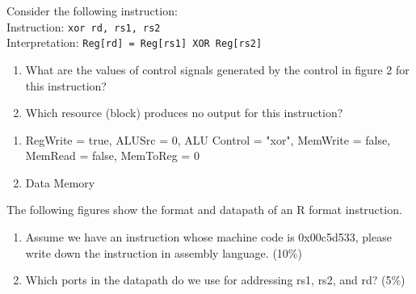 \documentclass[12pt, a4paper]{article}
\begin{document}
\pagebreak
\begin{q}{10}
Consider the following instruction:\\
Instruction: \texttt{xor rd, rs1, rs2}\\
Interpretation: \texttt{Reg[rd] = Reg[rs1] XOR Reg[rs2]}
\begin{enumerate}
    \item What are the values of control signals generated by the control in figure 2 for this
    instruction?
    \item Which resource (block) produces no output for this instruction?
\end{enumerate}
\begin{center}
\end{center}
\end{q}
\begin{ans}
    \begin{enumerate}
        \item RegWrite = true, ALUSrc = 0, ALU Control = "xor", MemWrite = false, \\MemRead = false, MemToReg = 0 
        \item Data Memory
    \end{enumerate}
\end{ans}
\pagebreak
\begin{q}{15}
The following figures show the format and datapath of an R format instruction.
\begin{enumerate}
    \item Assume we have an instruction whose machine code is 0x00c5d533, please write
    down the instruction in assembly language. (10\%)
    \item Which ports in the datapath do we use for addressing rs1, rs2, and rd? (5\%)
\end{enumerate}
\end{q}
\end{document}
